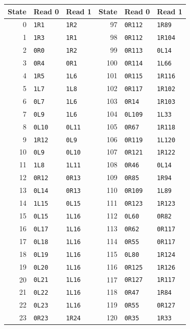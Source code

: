 \begin{longtable}{@{}rll@{\qquad}rll@{}}
\toprule State&Read 0&Read 1&State&Read 0&Read 1\\\midrule\endhead
0&\texttt{1R1}&\texttt{1R2}&97&\texttt{0R112}&\texttt{1R89}\\
1&\texttt{1R3}&\texttt{1R1}&98&\texttt{0R112}&\texttt{1R104}\\
2&\texttt{0R0}&\texttt{1R2}&99&\texttt{0R113}&\texttt{0L14}\\
3&\texttt{0R4}&\texttt{0R1}&100&\texttt{0R114}&\texttt{1L66}\\
4&\texttt{1R5}&\texttt{1L6}&101&\texttt{0R115}&\texttt{1R116}\\
5&\texttt{1L7}&\texttt{1L8}&102&\texttt{0R117}&\texttt{1R102}\\
6&\texttt{0L7}&\texttt{1L6}&103&\texttt{0R14}&\texttt{1R103}\\
7&\texttt{0L9}&\texttt{1L6}&104&\texttt{0L109}&\texttt{1L33}\\
8&\texttt{0L10}&\texttt{0L11}&105&\texttt{0R67}&\texttt{1R118}\\
9&\texttt{1R12}&\texttt{0L9}&106&\texttt{0R119}&\texttt{1L120}\\
10&\texttt{0L9}&\texttt{0L10}&107&\texttt{0R121}&\texttt{1R122}\\
11&\texttt{1L8}&\texttt{1L11}&108&\texttt{0R46}&\texttt{0L14}\\
12&\texttt{0R12}&\texttt{0R13}&109&\texttt{0R85}&\texttt{1R94}\\
13&\texttt{0L14}&\texttt{0R13}&110&\texttt{0R109}&\texttt{1L89}\\
14&\texttt{1L15}&\texttt{0L15}&111&\texttt{0R123}&\texttt{1R123}\\
15&\texttt{0L15}&\texttt{1L16}&112&\texttt{0L60}&\texttt{0R82}\\
16&\texttt{0L17}&\texttt{1L16}&113&\texttt{0R62}&\texttt{0R117}\\
17&\texttt{0L18}&\texttt{1L16}&114&\texttt{0R55}&\texttt{0R117}\\
18&\texttt{0L19}&\texttt{1L16}&115&\texttt{0L80}&\texttt{1R124}\\
19&\texttt{0L20}&\texttt{1L16}&116&\texttt{0R125}&\texttt{1R126}\\
20&\texttt{0L21}&\texttt{1L16}&117&\texttt{0R127}&\texttt{1R117}\\
21&\texttt{0L22}&\texttt{1L16}&118&\texttt{0R47}&\texttt{1R84}\\
22&\texttt{0L23}&\texttt{1L16}&119&\texttt{0R55}&\texttt{0R127}\\
23&\texttt{0R23}&\texttt{1R24}&120&\texttt{0R35}&\texttt{1R33}\\

\end{longtable}
